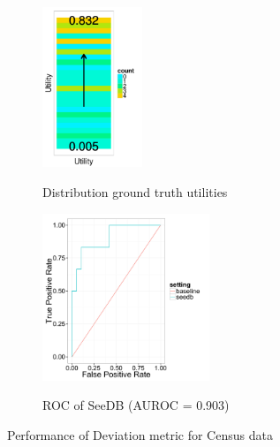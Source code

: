 \begin{figure}[t]
	\centering
	\begin{subfigure}{0.3\linewidth}
		{\includegraphics[trim={0 1.3cm 0 0}, clip, width=3cm]{Images/census_gt_distribution.pdf}}
		\caption{Distribution ground truth utilities}
		\label{fig:gt_dist}
	\end{subfigure}
	\begin{subfigure}{0.68\linewidth}
		\centering 
		{\includegraphics[width=5cm] {Images/seedb_roc.pdf}} 
		\caption{ROC of SeeDB (AUROC = 0.903)}
		\label{fig:roc}
	\end{subfigure}
	\vspace{-10pt}
	\caption{Performance of Deviation metric for Census data}
	\vspace{-10pt}
	\label{fig:census_gt}
\end{figure}

